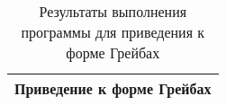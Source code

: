 \begin{table}[h!]
    \caption{Результаты выполнения программы для приведения к форме Грейбах}
    \label{tab:results2}
    \begin{tabular}{|ll|}
    \hline
    \multicolumn{2}{|c|}{Приведение к форме Грейбах}                                                                                                                                                                                                                                                                                                                                                                                                                                                                                                                                                                                                                                                                                                                                                                                                                         \\ \hline

\end{tabular}
\end{table}
